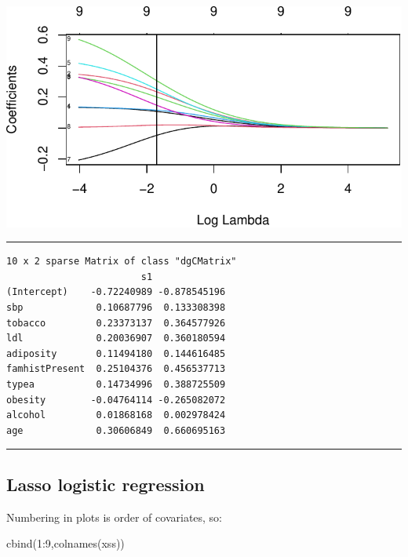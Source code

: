 \documentclass[
  letterpaper,
  DIV=11,
  numbers=noendperiod]{scrartcl}
\newenvironment{Shaded}{\begin{snugshade}}{\end{snugshade}}
\newcommand{\DecValTok}[1]{\textcolor[rgb]{0.68,0.00,0.00}{#1}}
\newcommand{\FunctionTok}[1]{\textcolor[rgb]{0.28,0.35,0.67}{#1}}
\newcommand{\NormalTok}[1]{\textcolor[rgb]{0.00,0.23,0.31}{#1}}
\newcommand{\SpecialCharTok}[1]{\textcolor[rgb]{0.37,0.37,0.37}{#1}}
\begin{document}
\includegraphics{L10_files/figure-pdf/unnamed-chunk-11-1.pdf}

\begin{center}\rule{0.5\linewidth}{0.5pt}\end{center}

\begin{verbatim}
10 x 2 sparse Matrix of class "dgCMatrix"
                        s1             
(Intercept)    -0.72240989 -0.878545196
sbp             0.10687796  0.133308398
tobacco         0.23373137  0.364577926
ldl             0.20036907  0.360180594
adiposity       0.11494180  0.144616485
famhistPresent  0.25104376  0.456537713
typea           0.14734996  0.388725509
obesity        -0.04764114 -0.265082072
alcohol         0.01868168  0.002978424
age             0.30606849  0.660695163
\end{verbatim}

\begin{center}\rule{0.5\linewidth}{0.5pt}\end{center}

\hypertarget{lasso-logistic-regression}{%
\subsection{Lasso logistic regression}\label{lasso-logistic-regression}}

Numbering in plots is order of covariates, so:

\begin{Shaded}
\begin{Highlighting}[]
\FunctionTok{cbind}\NormalTok{(}\DecValTok{1}\SpecialCharTok{:}\DecValTok{9}\NormalTok{,}\FunctionTok{colnames}\NormalTok{(xss))}
\end{Highlighting}
\end{Shaded}
\end{document}
